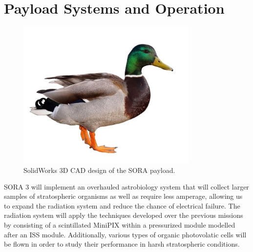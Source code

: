 \section{Payload Systems and Operation}
\label{sec:Hardware}

\begin{figure}[!ht]
\begin{center}
\includegraphics[width=0.8\textwidth]{./Figures/duck.jpg}
\caption{SolidWorks 3D CAD design of the SORA payload.}
\label{fig:payload} 
\end{center}
\end{figure}

SORA 3 will implement an overhauled astrobiology system that will collect larger samples of stratospheric organisms as well as require less amperage, allowing us to expand the radiation system and reduce the chance of electrical failure. The radiation system will apply the techniques developed over the previous missions by consisting of a scintillated MiniPIX within a pressurized module modelled after an ISS module. Additionally, various types of organic photovolatic cells will be flown in order to study their performance in harsh stratospheric conditions.
